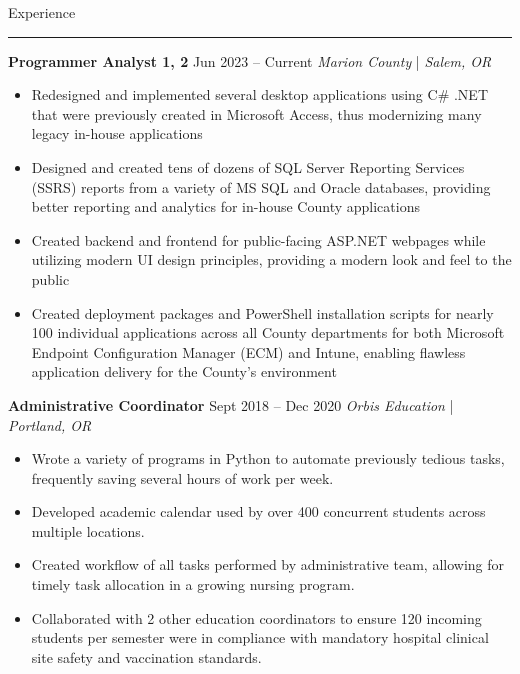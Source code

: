 \documentclass[11pt]{article}
\newcommand{\sectiontitle}[1]{
    \noindent\Large#1
    \newline
    \vspace{-0.18in}
    \hrule   
}
\newcommand{\occupation}[4]{
    \topitemspacing
    \normalsize
    \noindent\textbf{#1}
    \hfill
    \noindent#3
    \newline
    \noindent\textit{#2} | \textit{#4}
    \toplistspacing
}
\newcommand{\sectionendspace}{
    \vspace{0.1in}
}
\newcommand{\toplistspacing}{
    \vspace{0.04in}
}
\newcommand{\topitemspacing}{
    \vspace{0.1in}
}
\begin{document}
    \sectionendspace
    \sectiontitle{Experience}
    \occupation{Programmer Analyst 1, 2}{Marion County}
    {Jun 2023 -- Current}
    {Salem, OR}
    \begin{itemize}[noitemsep,nolistsep]
        \item Redesigned and implemented several desktop applications using C\# .NET that were previously created in Microsoft Access, thus modernizing many legacy in-house applications
        \item Designed and created tens of dozens of SQL Server Reporting Services (SSRS) reports from a variety of MS SQL and Oracle databases, providing better reporting and analytics for in-house County applications
        \item Created backend and frontend for public-facing ASP.NET webpages while utilizing modern UI design principles, providing a modern look and feel to the public
        \item Created deployment packages and PowerShell installation scripts for nearly 100 individual applications across all County departments for both Microsoft Endpoint Configuration Manager (ECM) and Intune, enabling flawless application delivery for the County's environment
    \end{itemize}
    \occupation{Administrative Coordinator}{Orbis Education}
    {Sept 2018 -- Dec 2020}
    {Portland, OR}
    \begin{itemize}[noitemsep,nolistsep]
        \item Wrote a variety of programs in Python to automate previously tedious tasks, frequently saving several hours of work per week.
        \item Developed academic calendar used by over 400 concurrent students across multiple locations.
        \item Created workflow of all tasks performed by administrative team, allowing for timely task allocation in a growing nursing program.
        \item Collaborated with 2 other education coordinators to ensure 120 incoming students per semester were in compliance with mandatory hospital clinical site safety and vaccination standards.
    \end{itemize}
\end{document}
